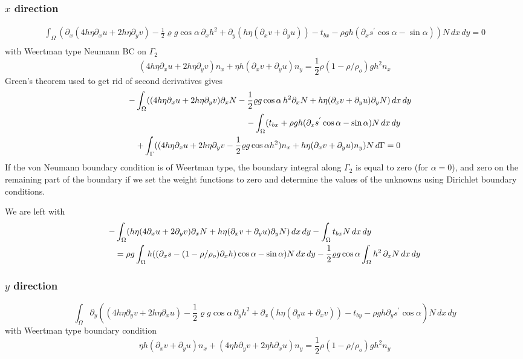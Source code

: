 \documentclass[10pt,a4paper]{book}
\newcommand{\p}{\partial}
\newcommand{\tbx}{t_{bx}}
\newcommand{\tby}{t_{by}}
\begin{document}
\subsubsection{$x$ direction}
\begin{eqnarray} 
\int_{\Omega} (\p_x ( 4 h \eta \p_x u + 2 h \eta \p_y v) -\frac{1}{2} \varrho g \cos \alpha \, \p_x h^2+\p_y ( h \eta (\p_x v + \p_y u)) - \tbx-
\rho g h (\p_x s^{'} \cos \alpha  -  \sin \alpha )) N \,dx \,dy =0 \nonumber \\ \nonumber
\end{eqnarray}
with Weertman type Neumann BC on $\Gamma_2$
\[
( 4 h \eta \p_x u + 2 h \eta \p_y v) n_x + \eta h (\p_x v +\p_y u) n_y =\frac{1}{2} \rho
(1-\rho/\rho_o)  g h^2  n_x
\]
Green's theorem used to get rid of second derivatives gives
\begin{eqnarray}
\lefteqn{- \int_{\Omega} ((4 h \eta \p_x u+ 2 h \eta \p_y v) \p_x N  
-\frac{1}{2} \varrho g \cos \alpha \, h^2 \p_x N
+ h \eta (\p_x v+\p_y u)  \p_y N) \, dx\, dy } \nonumber \\
& & -\int_{\Omega} ( \tbx + \rho g h (\p_x s^{'} \cos \alpha - \sin \alpha) N \, dx \, dy
\nonumber \\
& & +\int_{\Gamma} ((4 h \eta \p_x u + 2 h \eta \p_y v -\frac{1}{2} \varrho g \cos \alpha h^2) n_x + h \eta (\p_x v +\p_y u) n_y ) N \, d\Gamma
=0 \nonumber
\end{eqnarray}
If the von Neumann boundary condition is of Weertman type, the boundary integral along $\Gamma_2$ is
equal to zero (for $\alpha=0$), and zero on the remaining part of the boundary if we set the weight
functions to zero and determine the values of the unknowns using Dirichlet boundary conditions.

We are left with
\begin{eqnarray}
\lefteqn{- \int_{\Omega} ( h \eta (4 \p_x u+ 2  \p_y v) \p_x N  
+ h \eta (\p_x v+\p_y u)  \p_y N) \, dx\, dy  -\int_{\Omega}  \tbx N \, dx \, dy} 
\nonumber \\
& & = \rho g \int_{\Omega} h ((\p_x s-(1-\rho/\rho_o) \p_x h) \cos \alpha - \sin \alpha) N \, dx \, dy
- \frac{1}{2} \varrho g  \cos \alpha  \int_{\Omega}  h^2  \, \p_x N \, dx \, dy
 \nonumber
\end{eqnarray}


\subsubsection{$y$ direction}

\[
\int_{\Omega} \p_y (( 4 h \eta \p_y v + 2 h \eta \p_x u) - \frac{1}{2} \varrho g  \cos \alpha \, \p_y h^2
+\p_x ( h \eta (\p_y u + \p_x v)) - \tby
-\rho g h \p_y s^{'} \cos \alpha ) N \, dx \, dy
\]
with Weertman type boundary condition
\[
\eta h (\p_x v + \p_y u) n_x + ( 4 \eta h \p_y v + 2 \eta h \p_x u) n_y =\frac{1}{2} \rho
(1-\rho/\rho_o) g h^2  n_y
\]
\end{document}
